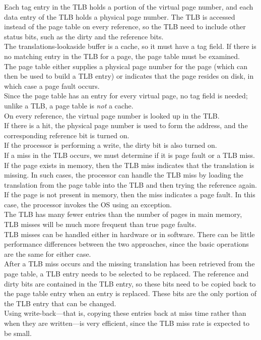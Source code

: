 \documentclass[12pt]{article}
\theoremstyle{definition}
\begin{document}
  Each tag entry in the TLB holds a portion of the virtual page number, and each data entry of the TLB holds a physical page number.
  The TLB is accessed instead of the page table on every reference, so the TLB need to include other status bits, such as the dirty and the reference bits. \\
  The translations-lookaside buffer is a cache, so it must have a tag field.
  If there is no matching entry in the TLB for a page, the page table must be examined. \\
  The page table either supplies a physical page number for the page (which can then be used to build a TLB entry) or indicates that the page resides on disk, in which case a page fault occurs. \\
  Since the page table has an entry for every virtual page, no tag field is needed;
  unlike a TLB, a page table is \emph{not} a cache. \\

  On every reference, the virtual page number is looked up in the TLB. \\
  If there is a hit, the physical page number is used to form the address, and the corresponding reference bit is turned on. \\
  If the processor is performing a write, the dirty bit is also turned on. \\

  If a miss in the TLB occurs, we must determine if it is page fault or a TLB miss.
  If the page exists in memory, then the TLB miss indicates that the translation is missing.
  In such cases, the processor can handle the TLB miss by loading the translation from the page table into the TLB and then trying the reference again. \\
  If the page is not present in memory, then the miss indicates a page fault.
  In this case, the processor invokes the OS using an exception. \\
  The TLB has many fewer entries than the number of pages in main memory, TLB misses will be much more frequent than true page faults. \\

  TLB misses can be handled either in hardware or in software.
  There can be little performance differences between the two approaches, since the basic operations are the same for either case. \\

  After a TLB miss occurs and the missing translation has been retrieved from the page table, a TLB entry needs to be selected to be replaced.
  The reference and dirty bits are contained in the TLB entry, so these bits need to be copied back to the page table entry when an entry is replaced.
  These bits are the only portion of the TLB entry that can be changed. \\
  Using write-back---that is, copying these entries back at miss time rather than when they are written---is very efficient, since the TLB miss rate is expected to be small. \\
\end{document}
